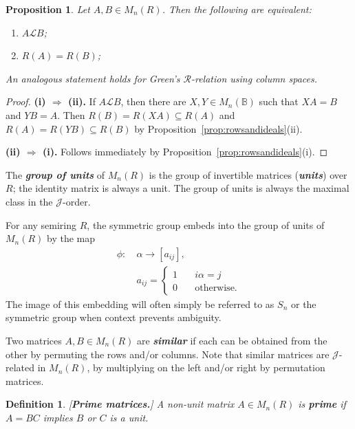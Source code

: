 \documentclass[11pt]{article}
\newtheorem{prop}[thm]{Proposition}
\newtheorem*{defi}{Definition}
\newenvironment{de}{\begin{defi}\rm}{\end{defi}}
\newcommand{\defn}[1]{\textbf{\textit{#1}}}
\numberwithin{equation}{section}
\renewcommand{\to}{\longrightarrow}
\newcommand{\B}{\mathbb{B}}
\newcommand{\Bn}{M_n(\B)}
\renewcommand{\L}{\mathscr{L}}
\newcommand{\R}{\mathscr{R}}
\newcommand{\J}{\mathscr{J}}
\begin{document}
\begin{prop} 
  Let $A, B \in M_n(R)$. Then the following are equivalent:
  \begin{enumerate}[label=\roman*]
    \item 
      $A \L B$;

    \item 
      $R(A) = R(B)$;
  \end{enumerate}
  An analogous statement holds for Green's $\R$-relation using column spaces. 
\end{prop}
\begin{proof}
  \textbf{(i) $\Rightarrow$ (ii).} 
  If $A \L B$, then there are 
  $X, Y \in \Bn$ such that $XA = B$ and $YB = A$. Then $R(B) = R(XA) \subseteq
  R(A)$ and $R(A) = R(YB) \subseteq R(B)$ by
  Proposition~\ref{prop:rowsandideals}(ii).
  \bigskip

  \textbf{(ii) $\Rightarrow$ (i).} Follows immediately by
  Proposition~\ref{prop:rowsandideals}(i). 
\end{proof}

The \defn{group of units} of $M_n(R)$ is the group of invertible matrices
(\defn{units}) over $R$; the identity matrix is always a unit. The group of
units is always the maximal class in the $\J$-order.

For any semiring $R$, the symmetric group embeds into the group of units of
$M_n(R)$ by the map 
\begin{align*}
  \phi:\: &\alpha \to [a_{ij}], \\
  &a_{ij} =
    \begin{cases}
      1 \quad & i\alpha = j \\ 
      0 \quad &\text{otherwise}.
    \end{cases}
\end{align*}
The image of this embedding will often simply be referred to as $S_n$ or the
symmetric group when context prevents ambiguity.

Two matrices $A, B\in M_n(R)$ are \defn{similar} if each can be obtained from
the other by permuting the rows and/or columns. Note that similar matrices are
$\J$-related in $M_n(R)$, by multiplying on the left and/or right by permutation
matrices.

\begin{de}[\textbf{Prime matrices.}]
  A non-unit matrix $A \in M_n(R)$ is \defn{prime} if $A = BC$ implies $B$ or
  $C$ is a unit.
\end{de}
\end{document}
